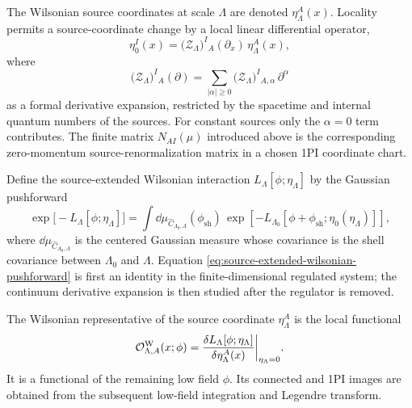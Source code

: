 The Wilsonian source coordinates at scale \(\Lambda\) are denoted
\(\eta_\Lambda^A(x)\).  Locality permits a source-coordinate change by a local
linear differential operator,
\begin{equation}
  \eta_0^I(x)
  =
  \bigl(\mathcal Z_\Lambda\bigr)^I{}_A(\partial_x)\,
  \eta_\Lambda^A(x),
  \label{eq:source-coordinate-local-differential-map}
\end{equation}
where
\[
  \bigl(\mathcal Z_\Lambda\bigr)^I{}_A(\partial)
  =
  \sum_{|\alpha|\ge0}
  \bigl(\mathcal Z_\Lambda\bigr)^I{}_{A,\alpha}\,
  \partial^\alpha
\]
as a formal derivative expansion, restricted by the spacetime and internal
quantum numbers of the sources.  For constant sources only the
\(\alpha=0\) term contributes.  The finite matrix \(N_{AI}(\mu)\) introduced
above is the corresponding zero-momentum source-renormalization matrix in a
chosen 1PI coordinate chart.

Define the source-extended Wilsonian interaction \(L_\Lambda[\phi;\eta_\Lambda]\)
by the Gaussian pushforward
\begin{equation}
  \exp\bigl[-L_\Lambda[\phi;\eta_\Lambda]\bigr]
  =
  \int\dd\mu_{\widehat C_{\Lambda_0,\Lambda}}(\phi_{\mathrm{sh}})\,
  \exp\left[
    -L_{\Lambda_0}[\phi+\phi_{\mathrm{sh}};\eta_0(\eta_\Lambda)]
  \right],
  \label{eq:source-extended-wilsonian-pushforward}
\end{equation}
where \(\dd\mu_{\widehat C_{\Lambda_0,\Lambda}}\) is the centered Gaussian
measure whose covariance is the shell covariance between \(\Lambda_0\) and
\(\Lambda\).  Equation
\eqref{eq:source-extended-wilsonian-pushforward} is first an identity in the
finite-dimensional regulated system; the continuum derivative expansion is
then studied after the regulator is removed.

\begin{definition}
The Wilsonian representative of the source coordinate \(\eta_\Lambda^A\) is
the local functional
\[
  \mathcal O_{\Lambda,A}^{\rm W}(x;\phi)
  =
  \frac{\delta L_\Lambda[\phi;\eta_\Lambda]}
       {\delta\eta_\Lambda^A(x)}
  \bigg|_{\eta_\Lambda=0}.
\]
It is a functional of the remaining low field \(\phi\).  Its connected and
1PI images are obtained from the subsequent low-field integration and
Legendre transform.
\end{definition}

